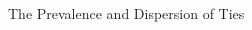 \documentclass[structurebold,final,hyperref=pdftex,bookmarks,colorlinks,breaklinks]{beamer}
\begin{document}
\begin{frame}
\begin{columns}[t]
\begin{column}{0.24\linewidth}
\begin{block}{The Prevalence and Dispersion of Ties}
        \begin{figure}[h]
        \begin{center}
         \\
        \end{center}
        \end{figure}
      \end{block}


\end{column}
\end{columns}
\end{frame}
\end{document}
